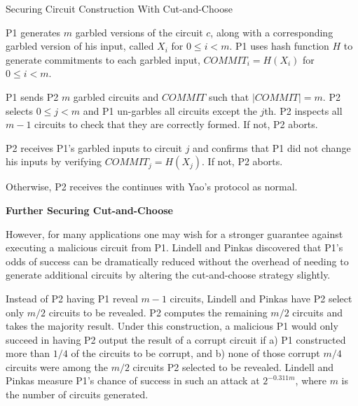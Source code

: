 \begin{algorithm}[H]
    \caption{Securing Circuit Construction With Cut-and-Choose}
    \label{alg:cutandchoose-basic}
    \begin{algorithmic}[1]
        \STATE \ac{P1} generates $m$ garbled versions of the circuit $c$, along with a corresponding garbled version of his input, called $X_i$ for $0 \leq i < m$.
        \STATE \ac{P1} uses hash function $H$ to generate commitments to each garbled input, $COMMIT_i = H(X_i)$ for $0 \leq i < m$.

        \STATE \ac{P1} sends \ac{P2} $m$ garbled circuits and $COMMIT$ such that $|COMMIT| = m$.
        \STATE \ac{P2} selects $0 \leq j < m$ and \ac{P1} un-garbles all circuits except the $j$th.
        \STATE \ac{P2} inspects all $m-1$ circuits to check that they are correctly formed. If not, \ac{P2} aborts.

        \STATE \ac{P2} receives \ac{P1}'s garbled inputs to circuit $j$ and confirms that \ac{P1} did not change his inputs by verifying $COMMIT_j = H(X_j)$. If not, \ac{P2} aborts.

        \STATE Otherwise, \ac{P2} receives the continues with Yao's protocol as normal.
    \end{algorithmic}
\end{algorithm}


\noindent\textbf{Further Securing Cut-and-Choose}

However, for many applications one may wish for a stronger guarantee against executing a malicious circuit from \ac{P1}.  Lindell and Pinkas\cite{lindell2007efficient} discovered that \ac{P1}'s odds of success can be dramatically reduced without the overhead of needing to generate additional circuits by altering the cut-and-choose strategy slightly.

Instead of \ac{P2} having \ac{P1} reveal $m-1$ circuits, Lindell and Pinkas have \ac{P2} select only $m/2$ circuits to be revealed.  \ac{P2} computes the remaining $m/2$ circuits and takes the majority result. Under this construction, a malicious \ac{P1} would only succeed in having \ac{P2} output the result of a corrupt circuit if a) \ac{P1} constructed more than $1/4$ of the circuits to be corrupt, and b) none of those corrupt $m/4$ circuits were among the $m/2$ circuits \ac{P2} selected to be revealed.  Lindell and Pinkas measure \ac{P1}'s chance of success in such an attack at $2^{-0.311m}$, where $m$ is the number of circuits generated\cite{lindell2007efficient}.\\[.5em]

